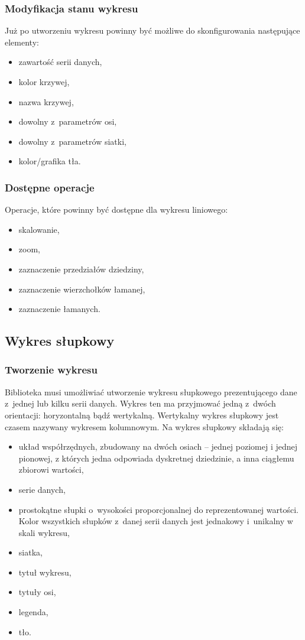 \documentclass[11pt,twoside,a4paper,final]{article}
\begin{document}
\subsubsection{Modyfikacja stanu wykresu}
Już po utworzeniu wykresu powinny być możliwe do skonfigurowania następujące elementy:
\begin{itemize}
\item{zawartość serii danych,}
\item{kolor krzywej,}
\item{nazwa krzywej,}
\item{dowolny z~parametrów osi,}
\item{dowolny z~parametrów siatki,}
\item{kolor/grafika tła.}
\end{itemize}

\subsubsection{Dostępne operacje}
Operacje, które powinny być dostępne dla wykresu liniowego:
\begin{itemize}
\item{skalowanie,}
\item{zoom,}
\item{zaznaczenie przedziałów dziedziny,}
\item{zaznaczenie wierzchołków łamanej,}
\item{zaznaczenie łamanych.}
\end{itemize}

\subsection{Wykres słupkowy}
\subsubsection{Tworzenie wykresu}
Biblioteka musi umożliwiać utworzenie wykresu słupkowego prezentującego dane z~jednej lub kilku serii danych. Wykres ten ma przyjmować jedną z~dwóch orientacji: horyzontalną bądź wertykalną. Wertykalny wykres słupkowy jest czasem nazywany wykresem kolumnowym. Na wykres słupkowy składają się:
\begin{itemize}
\item{układ współrzędnych, zbudowany na dwóch osiach -- jednej poziomej i jednej pionowej, z których jedna odpowiada dyskretnej dziedzinie, a inna ciągłemu zbiorowi wartości,}
\item{serie danych,}
\item{prostokątne słupki o~wysokości proporcjonalnej do reprezentowanej wartości. Kolor wszystkich słupków z~danej serii danych jest jednakowy i~unikalny w skali wykresu,}
\item{siatka,}
\item{tytuł wykresu,}
\item{tytuły osi,}
\item{legenda,}
\item{tło.}
\end{itemize}
\end{document}
